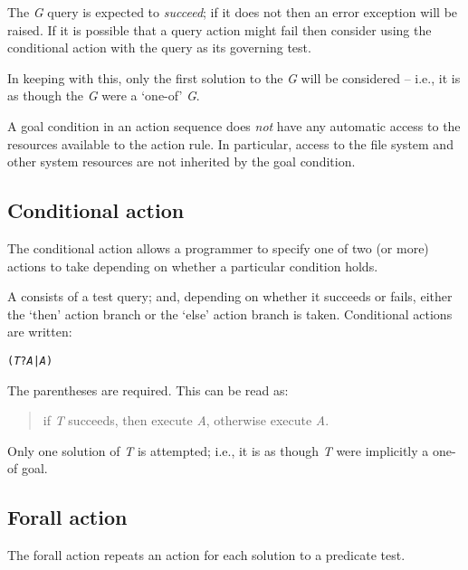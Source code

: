 The \emph{G} query is expected to \emph{succeed}; if it does not then an  error exception will be raised. If it is possible that a query action might fail then consider using the conditional action with the query as its governing test.

In keeping with this, only the first solution to the \emph{G} will be considered -- i.e., it is as though the \emph{G} were a `one-of' \emph{G}.

A goal condition in an action sequence does \emph{not} have any automatic access to the resources available to the action rule. In particular, access to the file system and other system resources are not inherited by the goal condition. 


\subsection{Conditional action}
\label{action:conditional}
The conditional action allows a programmer to specify one of two (or more) actions to take depending on whether a particular condition holds. 

A  consists of a test query; and, depending on whether it succeeds or fails, either the `then' action branch or the `else' action branch is taken.  Conditional actions are written:
\begin{alltt}
(\emph{T}?\emph{A}|\emph{A})
\end{alltt}
The parentheses are required. This can be read as:
\begin{quote}
if \emph{T} succeeds, then execute \emph{A}, otherwise execute \emph{A}.
\end{quote}
Only one solution of \emph{T} is attempted; i.e., it is as though \emph{T} were implicitly a one-of goal.

\subsection{Forall action}
\label{action:forall}
The forall action repeats an action for each solution to a predicate test.

